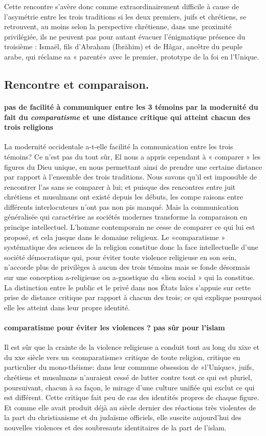 Cette rencontre s'avère donc comme extraordinairement difficile à cause de l'asymétrie entre les trois traditions si les deux premiers, juifs et chrétiens, se retrouvent, au moins selon la perspective chrétienne, dans une proximité privilégiée, ils ne peuvent pas pour autant évacuer l'énigmatique présence du troisième : Ismaël, fils d'Abraham (Ibrähim) et de Hâgar, ancêtre du peuple arabe, qui réclame sa « parenté» avec le premier, prototype de la foi en l'Unique.

\subsection{Rencontre et comparaison.}

\paragraph{pas de facilité à communiquer entre les 3 témoins par la modernité du fait du \textit{comparatisme} et une distance critique qui atteint chacun des trois religions}
La modernité occidentale a-t-elle facilité la communication entre les trois témoins? Ce n'est pas du tout sûr, El nous a appris cependant à « comparer » les figures du Dieu unique, en nous permettant ainsi de prendre une certaine distance par rapport à l'ensemble des trois traditions.
Nous savons qu'il est impossible de rencontrer l'as sans se comparer à lui; et puisque des rencontres entre juit chrétiens et musulmans ont existé depuis les débuts, les compe raisons entre différents interlocuteurs n'ont pas non pis manqué. Mais la communication généralisée qui caractérise as sociétés modernes transforme la comparaison en principe intellectuel. L'homme contemporain ne cesse de comparer ce qui lui est proposé, et cela jusque dans le domaine religieux. Le «comparatisme » systématique des sciences de la religion  constitue donc la face intellectuelle d'une société démocratique qui, pour éviter toute violence religieuse en son sein, n'accorde plus de privilèges à aucun des trois témoins mais se fonde désormais sur une conception a-religieuse ou a-gnostique du «lien social » qui la constitue. La distinction entre le public et le privé dans nos États laïcs s'appuie sur cette prise de distance critique par rapport à chacun des trois; ce qui explique pourquoi elle les atteint dans leur propre identité.
\paragraph{comparatisme pour éviter les violences ? pas sûr pour l'islam}
Il est sûr que la crainte de la violence religieuse a conduit tout au long du xixe et du xxe siècle vers un «comparatisme» critique de toute religion, critique en particulier du mono-théisme: dans leur commune obsession de «l'Unique», juifs, chrétiens et musulmans n'auraient cessé de lutter contre tout ce qui est pluriel, poursuivant, chacun à sa façon, le mirage d'une culture unifiée qui exclut ce qui est différent. Cette critique fait peu de cas des identités propres de chaque figure. 
Et comme elle avait produit déjà au siècle dernier des réactions très violentes de la part du christianisme et du judaïsme officiels, elle suscite aujourd'hui des nouvelles violences et des soubresauts identitaires de la part de l'islam. 
